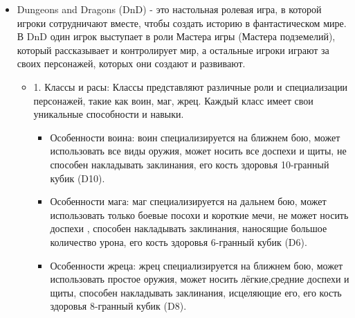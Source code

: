 \begin{itemize}
	\item Dungeons and Dragons (DnD) - это настольная ролевая игра, в которой игроки сотрудничают вместе, чтобы создать историю в фантастическом мире. В DnD один игрок выступает в роли Мастера игры (Мастера подземелий), который рассказывает и контролирует мир, а остальные игроки играют за своих персонажей, которых они создают и развивают.
	\begin{itemize} Основные элементы ролевой системы DnD включают:
		\item 1. Классы и расы: Классы представляют различные роли и специализации персонажей, такие как воин, маг, жрец. Каждый класс имеет свои уникальные способности и навыки.
			\begin{itemize}
				\item Особенности воина: воин специализируется на ближнем бою, может использовать все виды оружия, может носить все доспехи и щиты, не способен накладывать заклинания, его кость здоровья 10-гранный кубик (D10).
				\item Особенности мага: маг специализируется на дальнем бою, может использовать только боевые посохи и короткие мечи, не может носить доспехи , способен накладывать заклинания, наносящие большое количество урона, его кость здоровья 6-гранный кубик (D6).
				\item Особенности жреца: жрец специализируется на ближнем бою, может использовать простое оружия, может носить лёгкие,средние доспехи и щиты, способен накладывать заклинания, исцеляющие его, его кость здоровья 8-гранный кубик (D8).
			\end{itemize}


\end{itemize}
\end{itemize}
